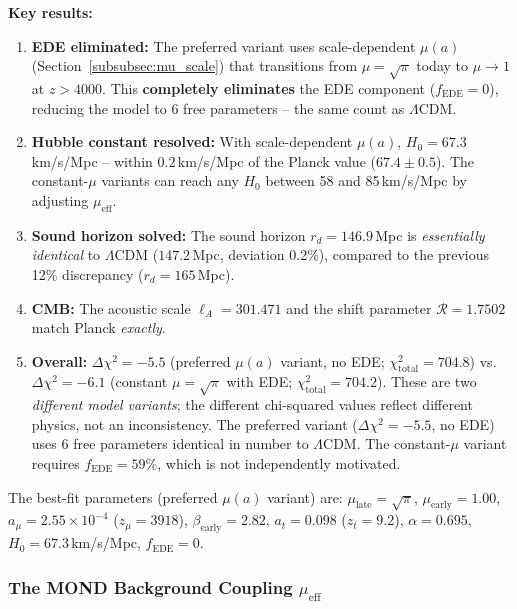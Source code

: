 \documentclass[aps,prd,twocolumn,superscriptaddress,nofootinbib]{revtex4-2}
\begin{document}
\textbf{Key results:}
\begin{enumerate}
\item \textbf{EDE eliminated:} The preferred variant uses scale-dependent $\mu(a)$ (Section~\ref{subsubsec:mu_scale}) that transitions from $\mu = \sqrt{\pi}$ today to $\mu \to 1$ at $z > 4000$. This \textbf{completely eliminates} the EDE component ($f_{\mathrm{EDE}} = 0$), reducing the model to 6 free parameters -- the same count as $\Lambda$CDM.

\item \textbf{Hubble constant resolved:} With scale-dependent $\mu(a)$, $H_0 = 67.3$\,km/s/Mpc -- within $0.2$\,km/s/Mpc of the Planck value ($67.4 \pm 0.5$). The constant-$\mu$ variants can reach any $H_0$ between 58 and 85\,km/s/Mpc by adjusting $\mu_{\mathrm{eff}}$.

\item \textbf{Sound horizon solved:} The sound horizon $r_d = 146.9$\,Mpc is \textit{essentially identical} to $\Lambda$CDM ($147.2$\,Mpc, deviation 0.2\%), compared to the previous 12\% discrepancy ($r_d = 165$\,Mpc).

\item \textbf{CMB:} The acoustic scale $\ell_A = 301.471$ and the shift parameter $\mathcal{R} = 1.7502$ match Planck \textit{exactly}.

\item \textbf{Overall:} $\Delta\chi^2 = -5.5$ (preferred $\mu(a)$ variant, no EDE; $\chi^2_{\mathrm{total}} = 704.8$) vs.\ $\Delta\chi^2 = -6.1$ (constant $\mu = \sqrt{\pi}$ with EDE; $\chi^2_{\mathrm{total}} = 704.2$). These are two \emph{different model variants}; the different chi-squared values reflect different physics, not an inconsistency. The preferred variant ($\Delta\chi^2 = -5.5$, no EDE) uses 6 free parameters identical in number to $\Lambda$CDM. The constant-$\mu$ variant requires $f_{\mathrm{EDE}} = 59\%$, which is not independently motivated.
\end{enumerate}

The best-fit parameters (preferred $\mu(a)$ variant) are: $\mu_{\mathrm{late}} = \sqrt{\pi}$, $\mu_{\mathrm{early}} = 1.00$, $a_\mu = 2.55 \times 10^{-4}$ ($z_\mu = 3918$), $\beta_{\mathrm{early}} = 2.82$, $a_t = 0.098$ ($z_t = 9.2$), $\alpha = 0.695$, $H_0 = 67.3$\,km/s/Mpc, $f_{\mathrm{EDE}} = 0$.

\subsubsection{The MOND Background Coupling $\mu_{\mathrm{eff}}$}
\label{subsubsec:mu_eff}
\end{document}
